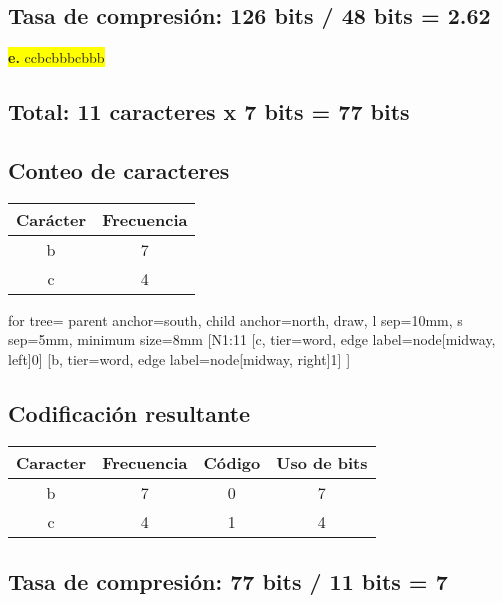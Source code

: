 \documentclass{article}
\begin{document}
\begin{center}
		\subsection*{Tasa de compresión: 126 bits / 48 bits = 2.62}	
	\end{center}
	
	\newpage
	\vspace{0.5cm}
	\begin{center}
		\hspace{3cm}\colorbox{yellow}{{\textbf{e.} ccbcbbbcbbb}}\newline
		\subsection*{Total: 11 caracteres x 7 bits = 77 bits}
		\vspace{0.5cm}
		\subsection*{Conteo de caracteres}
		\begin{tabular}{c|c}
			\textbf{Carácter} & \textbf{Frecuencia} \\
			\hline
			b & 7 \\
			c & 4 \\
		\end{tabular}
		
		\vspace{1cm}
		
		\begin{forest}
			for tree={
				parent anchor=south,
				child anchor=north,
				draw,
				l sep=10mm,
				s sep=5mm,
				minimum size=8mm
			}
			[N1:11
			[c, tier=word, edge label={node[midway, left]{0}}]
			[b, tier=word, edge label={node[midway, right]{1}}]
			]
		\end{forest}
		
		
		\subsection*{Codificación resultante}
		\begin{tabular}{c|c|c|c}
			\textbf{Caracter} & \textbf{Frecuencia} & \textbf{Código} & \textbf{Uso de bits}\\
			\hline
			b & 7 & 0 & 7\\
			c & 4 & 1 & 4\\
		\end{tabular}
		\subsection*{Tasa de compresión: 77 bits / 11 bits = 7}	
	\end{center}
	
\end{document}
